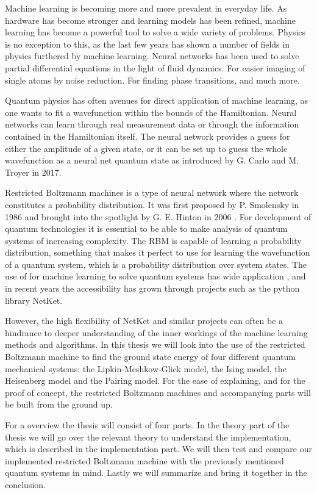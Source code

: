 Machine learning is becoming more and more prevalent in everyday life. As hardware has become stronger and learning models has been refined, machine learning has become a powerful tool to solve a wide variety of problems. Physics is no exception to this, as the last few years has shown a number of fields in physics furthered by machine learning. Neural networks has been used to solve partial differential equations in the light of fluid dynamics\cite{RAISSI2019686}. For easier imaging of single atoms by noise reduction\cite{PhysRevApplied.14.014011}. For finding phase transitions\cite{vanNieuwenburg2017}, and much more.

Quantum physics has often avenues for direct application of machine learning, as one wants to fit a wavefunction within the bounds of the Hamiltonian. Neural networks can learn through real measurement data or through the information contained in the Hamiltonian itself. The neural network provides a guess for either the amplitude of a given state, or it can be set up to guess the whole wavefunction as a neural net quantum state as introduced by G. Carlo and M. Troyer in 2017\cite{Carleo_2017}.

Restricted Boltzmann machines is a type of neural network where the network constitutes a probability distribution. It was first proposed by P. Smolensky in 1986 \cite{paul} and brought into the spotlight by G. E. Hinton in 2006 \cite{gehinton}. For development of quantum technologies it is essential to be able to make analysis of quantum systems of increasing complexity. The RBM is capable of learning a probability distribution, something that makes it perfect to use for learning the wavefunction of a quantum system, which is a probability distribution over system states. The use of for machine learning to solve quantum systems has wide application \cite{Xia2018}\cite{PhysRevLett.108.058301}, and in recent years the accessibility has grown through projects such as the python library NetKet\cite{netket3:2022}\cite{netket2:2019}\cite{mpi4jax:2021}. 

However, the high flexibility of NetKet and similar projects can often be a hindrance to deeper understanding of the inner workings of the machine learning methods and algorithms. In this thesis we will look into the use of the restricted Boltzmann machine to find the ground state energy of four different quantum mechanical systems: the Lipkin-Meshkow-Glick model, the Ising model, the Heisenberg model and the Pairing model. For the ease of explaining, and for the proof of concept, the restricted Boltzmann machines and accompanying parts will be built from the ground up.

For a overview the thesis will consist of four parts. In the theory part of the thesis we will go over the relevant theory to understand the implementation, which is described in the implementation part. We will then test and compare our implemented restricted Boltzmann machine with the previously mentioned quantum systems in mind. Lastly we will summarize and bring it together in the conclusion.

